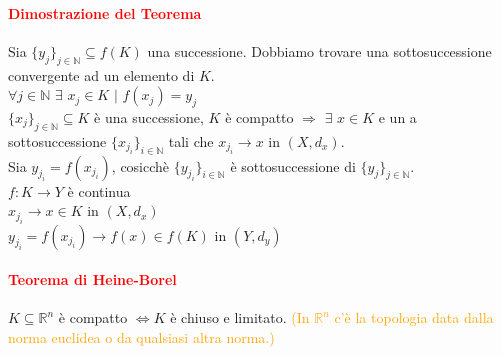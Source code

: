\documentclass{article}
\newcommand{\R}{\mathbb{R}}
\newcommand{\N}{\mathbb{N}}
\begin{document}
\paragraph{\textcolor{red}{Dimostrazione del Teorema}}
Sia $\{y_j\}_{j\in\N}\subseteq f(K)$ una successione. Dobbiamo trovare una sottosuccessione convergente ad un elemento di $K$.\\
$\forall j \in \N \,\,\exists\,\, x_j\in K \,\,|\,\, f(x_j)=y_j$\\
$\{x_j\}_{j \in \N} \subseteq K$ è una successione, $K$ è compatto $\Rightarrow \,\, \exists\,\, x \in K$ e un a sottosuccessione $\{x_{j_i}\}_{i\in \N}$ tali che $x_{j_i}\rightarrow x$ in $(X,d_x)$.\\
Sia $y_{j_i}=f(x_{j_i})$, cosicchè $\{y_{j_i}\}_{i\in\N}$ è sottosuccessione di $\{y_j\}_{j\in\N}$.\\
$f:K\rightarrow Y$ è continua\\
$x_{j_i}\rightarrow x \in K$ in $(X,d_x)$\\
$y_{j_i}=f(x_{j_i})\rightarrow f(x) \in f(K)$ in $(Y,d_y)$
\begin{flushright}
\large\Lightning
\end{flushright}

\paragraph{\textcolor{red}{Teorema di Heine-Borel}}
$K \subseteq \R^n$ è compatto $\Leftrightarrow K$ è chiuso e limitato. \textcolor{orange}{(In $\R^n$ c'è la topologia data dalla norma euclidea o da qualsiasi altra norma.)}
\end{document}
